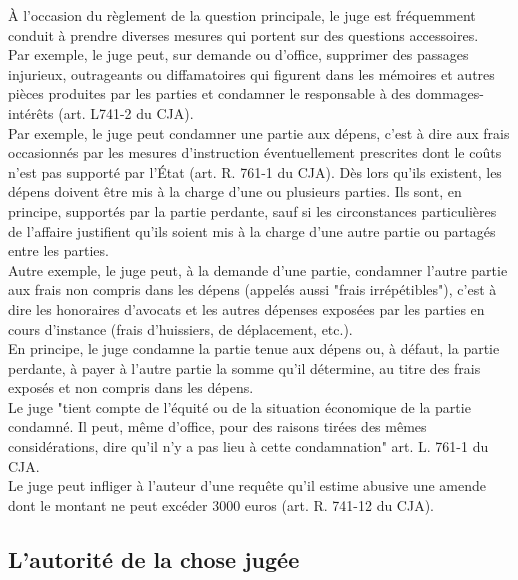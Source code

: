 \documentclass[10pt, a4paper, openany]{book}
\begin{document}
À l'occasion du règlement de la question principale, le juge est fréquemment conduit à prendre diverses mesures qui portent sur des questions accessoires. \\
Par exemple, le juge peut, sur demande ou d'office, supprimer des passages injurieux, outrageants ou diffamatoires qui figurent dans les mémoires et autres pièces produites par les parties et condamner le responsable à des dommages-intérêts (art. L741-2 du CJA). \\
Par exemple, le juge peut condamner une partie aux dépens, c'est à dire aux frais occasionnés par les mesures d'instruction éventuellement prescrites dont le coûts n'est pas supporté par l'État (art. R. 761-1 du CJA). Dès lors qu'ils existent, les dépens doivent être mis à la charge d'une ou plusieurs parties. Ils sont, en principe, supportés par la partie perdante, sauf si les circonstances particulières de l'affaire justifient qu'ils soient mis à la charge d'une autre partie ou partagés entre les parties. \\
Autre exemple, le juge peut, à la demande d'une partie, condamner l'autre partie aux frais non compris dans les dépens (appelés aussi "frais irrépétibles"), c'est à dire les honoraires d'avocats et les autres dépenses exposées par les parties en cours d'instance (frais d'huissiers, de déplacement, etc.). \\
En principe, le juge condamne la partie tenue aux dépens ou, à défaut, la partie perdante, à payer à l'autre partie la somme qu'il détermine, au titre des frais exposés et non compris dans les dépens. \\
Le juge "tient compte de l'équité ou de la situation économique de la partie condamné. Il peut, même d'office, pour des raisons tirées des mêmes considérations, dire qu'il n'y a pas lieu à cette condamnation" art. L. 761-1 du CJA. \\
Le juge peut infliger à l'auteur d'une requête qu'il estime abusive une amende dont le montant ne peut excéder 3000 euros (art. R. 741-12 du CJA). 

\subsection{L'autorité de la chose jugée}
\end{document}
